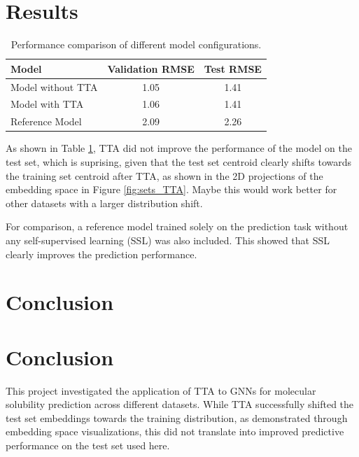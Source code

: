 \documentclass[11pt,a4paper]{article}
\begin{document}
\section{Results}

\begin{table}[htbp]
        \centering
        \begin{tabular}{@{}lcc@{}}
                \toprule
                \textbf{Model}    & \textbf{Validation RMSE} & \textbf{Test RMSE} \\
                \midrule
                Model without TTA & 1.05                     & 1.41               \\
                Model with TTA    & 1.06                     & 1.41               \\
                Reference Model   & 2.09                     & 2.26               \\
                \bottomrule
        \end{tabular}
        \caption{Performance comparison of different model configurations.}
        \label{tab:results}
\end{table}

As shown in Table \ref{tab:results}, TTA did not improve the performance of the model on the test set, which is suprising, given that the test set centroid clearly shifts towards the training set centroid after TTA, as shown in the 2D projections of the embedding space in Figure \ref{fig:sets_TTA}. Maybe this would work better for other datasets with a larger distribution shift.

For comparison, a reference model trained solely on the prediction task without any self-supervised learning (SSL) was also included. This showed that SSL clearly improves the prediction performance.

\section{Conclusion}

\section{Conclusion}

This project investigated the application of TTA to GNNs for molecular solubility prediction across different datasets. While TTA successfully shifted the test set embeddings towards the training distribution, as demonstrated through embedding space visualizations, this did not translate into improved predictive performance on the test set used here.



\end{document}
